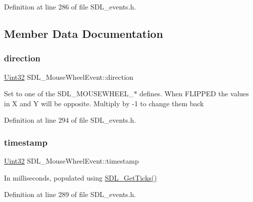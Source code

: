 Definition at line 286 of file S\+D\+L\+\_\+events.\+h.



\subsection{Member Data Documentation}
\mbox{\label{struct_s_d_l___mouse_wheel_event_a9fc46552d116499e5b8ca89d66df932c}} 
\subsubsection{\texorpdfstring{direction}{direction}}
{\footnotesize\ttfamily \mbox{\hyperlink{_s_d_l__stdinc_8h_add440eff171ea5f55cb00c4a9ab8672d}{Uint32}} S\+D\+L\+\_\+\+Mouse\+Wheel\+Event\+::direction}

Set to one of the S\+D\+L\+\_\+\+M\+O\+U\+S\+E\+W\+H\+E\+E\+L\+\_\+$\ast$ defines. When F\+L\+I\+P\+P\+ED the values in X and Y will be opposite. Multiply by -\/1 to change them back 

Definition at line 294 of file S\+D\+L\+\_\+events.\+h.

\mbox{\label{struct_s_d_l___mouse_wheel_event_a83ad52c80ff49a8e75dc6c33bba65fa0}} 
\subsubsection{\texorpdfstring{timestamp}{timestamp}}
{\footnotesize\ttfamily \mbox{\hyperlink{_s_d_l__stdinc_8h_add440eff171ea5f55cb00c4a9ab8672d}{Uint32}} S\+D\+L\+\_\+\+Mouse\+Wheel\+Event\+::timestamp}

In milliseconds, populated using \mbox{\hyperlink{_s_d_l__timer_8h_a0b9bc71d6287e0ffafdc3419760fe2b3}{S\+D\+L\+\_\+\+Get\+Ticks()}} 

Definition at line 289 of file S\+D\+L\+\_\+events.\+h.

\mbox{\label{struct_s_d_l___mouse_wheel_event_aa6b741e99df708c6f9550ee0f520fb70}} 
